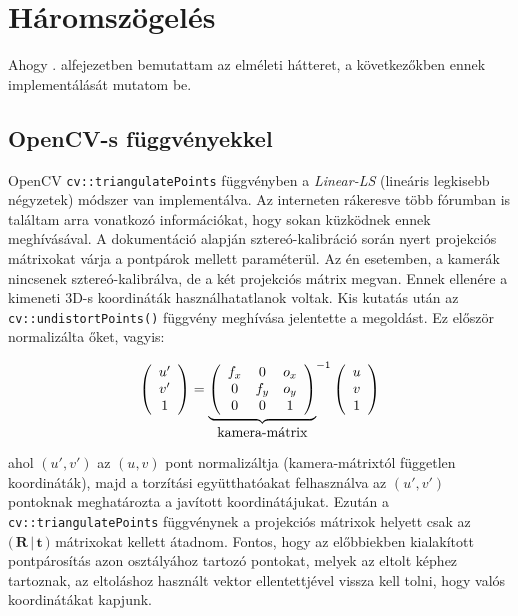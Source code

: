 \section{Háromszögelés}

Ahogy . alfejezetben bemutattam az elméleti hátteret, a következőkben ennek implementálását mutatom be.

\subsection{OpenCV-s függvényekkel}

OpenCV \texttt{cv::triangulatePoints} függvényben a \textit{Linear-LS} (lineáris legkisebb négyzetek) módszer van implementálva. Az interneten rákeresve több fórumban is találtam arra vonatkozó információkat, hogy sokan küzködnek ennek meghívásával. A dokumentáció \cite{camera-calib-3d} alapján sztereó-kalibráció során nyert projekciós mátrixokat várja a pontpárok mellett paraméterül. Az én esetemben, a kamerák nincsenek sztereó-kalibrálva, de a két projekciós mátrix megvan. Ennek ellenére a kimeneti 3D-s koordináták használhatatlanok voltak. Kis kutatás után az \texttt{cv::undistortPoints()} függvény meghívása jelentette a megoldást. Ez először normalizálta őket, vagyis:

\[\left(\begin{array}{c} u' \\ v' \\ 1 \end{array}\right) = {\underbrace{\left(\begin{array}{ccc}
f_x & 0 & o_x \\ 
0 & f_y & o_y \\
0 & 0 & 1
\end{array}\right)}_{\hbox{kamera-mátrix}}}^{-1} \left(\begin{array}{c} u \\ v \\ 1 \end{array}\right)\]

ahol $(u', v')$ az $(u, v)$ pont normalizáltja (kamera-mátrixtól független koordináták), majd a torzítási együtthatóakat felhasználva az $(u', v')$ pontoknak meghatározta a javított koordinátájukat. Ezután a \texttt{cv::triangulatePoints} függvénynek a projekciós mátrixok helyett csak az $\Big(\,\mathbf{R}\,|\,\mathbf{t}\,\Big)$ mátrixokat kellett átadnom. Fontos, hogy az előbbiekben kialakított pontpárosítás azon osztályához tartozó pontokat, melyek az eltolt képhez tartoznak, az eltoláshoz használt vektor ellentettjével vissza kell tolni, hogy valós koordinátákat kapjunk.

